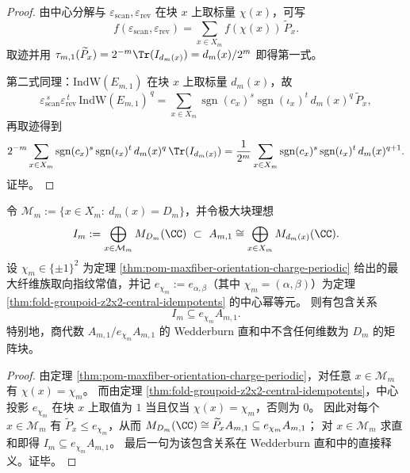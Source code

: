 \begin{proof}
由中心分解与 \(\varepsilon_{\mathrm{scan}},\varepsilon_{\mathrm{rev}}\) 在块 \(x\) 上取标量 \(\chi(x)\)，可写
\[
f(\varepsilon_{\mathrm{scan}},\varepsilon_{\mathrm{rev}})
=\sum_{x\in X_m} f(\chi(x))\,\widetilde P_x.
\]
取迹并用 \(\tau_{m,1}(\widetilde P_x)=2^{-m}\Tr(I_{d_m(x)})=d_m(x)/2^m\) 即得第一式。
\par
第二式同理：\(\mathrm{IndW}(E_{m,1})\) 在块 \(x\) 上取标量 \(d_m(x)\)，故
\[
\varepsilon_{\mathrm{scan}}^{\,s}\varepsilon_{\mathrm{rev}}^{\,t}\,\mathrm{IndW}(E_{m,1})^{\,q}
=\sum_{x\in X_m}\operatorname{sgn}(c_x)^s\operatorname{sgn}(\iota_x)^t\,d_m(x)^q\,\widetilde P_x,
\]
再取迹得到
\[
2^{-m}\sum_{x\in X_m}\operatorname{sgn}(c_x)^s\operatorname{sgn}(\iota_x)^t\,d_m(x)^q\,\Tr(I_{d_m(x)})
=\frac{1}{2^m}\sum_{x\in X_m}\operatorname{sgn}(c_x)^s\operatorname{sgn}(\iota_x)^t\,d_m(x)^{q+1}.
\]
证毕。
\end{proof}

\begin{proposition}\label{prop:fold-groupoid-maxblock-chi-homogeneity}
令 \(\mathcal{M}_m:=\{x\in X_m:\ d_m(x)=D_m\}\)，并令极大块理想
\[
I_m:=\bigoplus_{x\in\mathcal{M}_m}M_{D_m}(\CC)\ \subset\ A_{m,1}\cong\bigoplus_{x\in X_m}M_{d_m(x)}(\CC).
\]
设 \(\chi_m\in\{\pm1\}^2\) 为定理 \ref{thm:pom-maxfiber-orientation-charge-periodic} 给出的最大纤维族取向指纹常值，并记 \(e_{\chi_m}:=e_{\alpha,\beta}\)（其中 \(\chi_m=(\alpha,\beta)\)）为定理 \ref{thm:fold-groupoid-z2x2-central-idempotents} 的中心幂等元。
则有包含关系
\[
\boxed{\;I_m\subseteq e_{\chi_m}A_{m,1}.\;}
\]
特别地，商代数 \(A_{m,1}/e_{\chi_m}A_{m,1}\) 的 Wedderburn 直和中不含任何维数为 \(D_m\) 的矩阵块。
\end{proposition}
\begin{proof}
由定理 \ref{thm:pom-maxfiber-orientation-charge-periodic}，对任意 \(x\in\mathcal{M}_m\) 有 \(\chi(x)=\chi_m\)。
而由定理 \ref{thm:fold-groupoid-z2x2-central-idempotents}，中心投影 \(e_{\chi_m}\) 在块 \(x\) 上取值为 \(1\) 当且仅当 \(\chi(x)=\chi_m\)，否则为 \(0\)。
因此对每个 \(x\in\mathcal{M}_m\) 有 \(\widetilde P_x\le e_{\chi_m}\)，从而
\(
M_{D_m}(\CC)\cong \widetilde P_xA_{m,1}\subseteq e_{\chi_m}A_{m,1}
\)；
对 \(x\in\mathcal{M}_m\) 求直和即得 \(I_m\subseteq e_{\chi_m}A_{m,1}\)。
最后一句为该包含关系在 Wedderburn 直和中的直接释义。证毕。
\end{proof}

